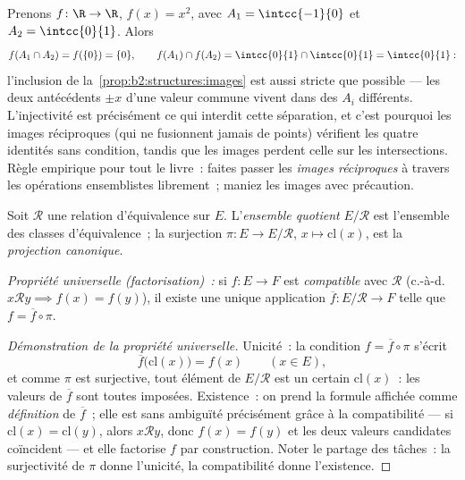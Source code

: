 \begin{example}\label{ex:b2:structures:imagestrict}
Prenons $f \colon \R \to \R$, $f(x) = x^2$, avec $A_1 =
\intcc{-1}{0}$ et $A_2 = \intcc{0}{1}$. Alors
\[
f(A_1 \cap A_2) = f(\{0\}) = \{0\},
\qquad
f(A_1) \cap f(A_2) = \intcc{0}{1} \cap \intcc{0}{1} =
\intcc{0}{1} :
\]
l'inclusion de la~\cref{prop:b2:structures:images} est aussi
stricte que possible --- les deux antécédents $\pm x$ d'une
valeur commune vivent dans des $A_i$ différents. L'injectivité
est précisément ce qui interdit cette séparation, et c'est
pourquoi les images réciproques (qui ne fusionnent jamais de
points) vérifient les quatre identités sans condition, tandis que
les images perdent celle sur les intersections. Règle empirique
pour tout le livre~: faites passer les \emph{images réciproques} à
travers les opérations ensemblistes librement~; maniez les images
avec précaution.
\end{example}

\begin{definition}\label{def:b2:structures:quotient}
Soit $\mathcal{R}$ une relation d'équivalence sur $E$. L'\emph{ensemble
quotient} $E/\mathcal{R}$ est l'ensemble des
classes d'équivalence~; la surjection $\pi \colon E \to E/\mathcal{R}$,
$x \mapsto \mathrm{cl}(x)$, est la \emph{projection
canonique}.

\emph{Propriété universelle (factorisation)~:} si $f \colon E \to F$ est
\emph{compatible} avec $\mathcal{R}$ (c.-à-d.\ $x \mathbin{\mathcal{R}}
y \implies f(x) = f(y)$), il existe une unique application $\overline f
\colon E/\mathcal{R} \to F$ telle que $f = \overline f \circ \pi$.
\end{definition}

\begin{proof}[Démonstration de la propriété universelle]
Unicité~: la condition $f = \overline f \circ \pi$ s'écrit
\[
\overline f\bigl(\mathrm{cl}(x)\bigr) = f(x)
\qquad (x \in E),
\]
et comme $\pi$ est surjective, tout élément de
$E/\mathcal{R}$ est un certain $\mathrm{cl}(x)$~: les valeurs de
$\overline f$ sont toutes imposées. Existence~: on prend la
formule affichée comme \emph{définition} de $\overline f$~; elle
est sans ambiguïté précisément grâce à la compatibilité --- si
$\mathrm{cl}(x) = \mathrm{cl}(y)$, alors $x \mathbin{\mathcal{R}}
y$, donc $f(x) = f(y)$ et les deux valeurs candidates coïncident
--- et elle factorise $f$ par construction. Noter le partage des
tâches~: la surjectivité de $\pi$ donne l'unicité, la
compatibilité donne l'existence.
\end{proof}

